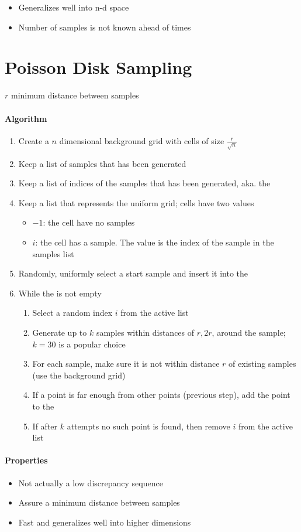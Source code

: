   \begin{itemize}
    \item Generalizes well into n-d space
    \item Number of samples is not known ahead of times
  \end{itemize}

\section{Poisson Disk Sampling}

  $ r $ minimum distance between samples

  \paragraph{Algorithm}
  \begin{enumerate}
    \item Create a $ n $ dimensional background grid with cells of size
    $ \frac{r}{\sqrt{n}} $
    \item Keep a list of samples that has been generated
    \item Keep a list of indices of the samples that has been generated, aka.
    the 
    \item Keep a list that represents the uniform grid; cells have two values
    \begin{itemize}
      \item $ -1 $: the cell have no samples
      \item $ i $: the cell has a sample. The value is the index of the sample
      in the samples list
    \end{itemize}

    \item Randomly, uniformly select a start sample and insert it into the
    \item While the  is not empty
    \begin{enumerate}
      \item Select a random index $ i $ from the active list
      \item Generate up to $ k $ samples within distances of $ r, 2r $,
      around the sample; $ k = 30 $ is a popular choice
      \item For each sample, make sure it is not within distance $ r $ of
      existing samples (use the background grid)
      \item If a point is far enough from other points (previous step), add
      the point to the 
      \item If after $ k $ attempts no such point is found, then remove $ i $
      from the active list
    \end{enumerate}
  \end{enumerate}

  \paragraph{Properties}
  \begin{itemize}
    \item Not actually a low discrepancy sequence
    \item Assure a minimum distance between samples
    \item Fast and generalizes well into higher dimensions
  \end{itemize}
